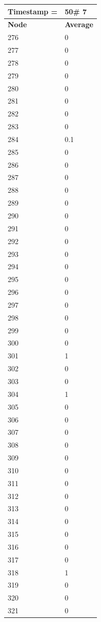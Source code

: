 \begin{tabular}{|l||l|}
\hline
\textbf{Timestamp =} & \textbf{50}\# 7\\\hline
	\textbf{Node} & \textbf{Average} \\ \hline
\hline
	276 & 0 \\ \hline
	277 & 0 \\ \hline
	278 & 0 \\ \hline
	279 & 0 \\ \hline
	280 & 0 \\ \hline
	281 & 0 \\ \hline
	282 & 0 \\ \hline
	283 & 0 \\ \hline
	284 & 0.1 \\ \hline
	285 & 0 \\ \hline
	286 & 0 \\ \hline
	287 & 0 \\ \hline
	288 & 0 \\ \hline
	289 & 0 \\ \hline
	290 & 0 \\ \hline
	291 & 0 \\ \hline
	292 & 0 \\ \hline
	293 & 0 \\ \hline
	294 & 0 \\ \hline
	295 & 0 \\ \hline
	296 & 0 \\ \hline
	297 & 0 \\ \hline
	298 & 0 \\ \hline
	299 & 0 \\ \hline
	300 & 0 \\ \hline
	301 & 1 \\ \hline
	302 & 0 \\ \hline
	303 & 0 \\ \hline
	304 & 1 \\ \hline
	305 & 0 \\ \hline
	306 & 0 \\ \hline
	307 & 0 \\ \hline
	308 & 0 \\ \hline
	309 & 0 \\ \hline
	310 & 0 \\ \hline
	311 & 0 \\ \hline
	312 & 0 \\ \hline
	313 & 0 \\ \hline
	314 & 0 \\ \hline
	315 & 0 \\ \hline
	316 & 0 \\ \hline
	317 & 0 \\ \hline
	318 & 1 \\ \hline
	319 & 0 \\ \hline
	320 & 0 \\ \hline
	321 & 0 \\ \hline
\end{tabular}
